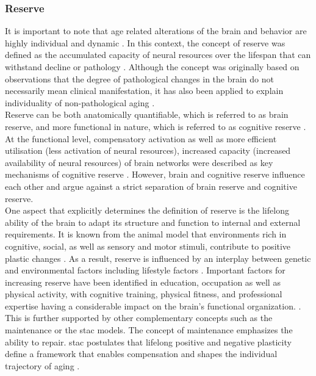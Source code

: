 \subsubsection{Reserve}
\label{theory:aging:reserve}
It is important to note that age related alterations of the brain and behavior are highly individual and dynamic \cite{Smith2020,Koen2019,Douw2014}. In this context, the concept of reserve was defined as the accumulated capacity of neural resources over the lifespan that can withstand decline or pathology \cite{Cabeza2018, Stern2009}. Although the concept was originally based on observations that the degree of pathological changes in the brain do not necessarily mean clinical manifestation, it has also been applied to explain individuality of non-pathological aging \cite{Esiri2001,Cabeza2018,Stern2009}.\\
Reserve can be both anatomically quantifiable, which is referred to as brain reserve, and more functional in nature, which is referred to as cognitive reserve \cite{Stern2009}. At the functional level, compensatory activation as well as more efficient utilisation (less activation of neural resources), increased capacity (increased availability of neural resources) of brain networks were described as key mechanisms of cognitive reserve \cite{Stern2004,Stern2009}. However, brain and cognitive reserve influence each other and \citeauthor{Cabeza2018} \cite{Cabeza2018} argue against a strict separation of brain reserve and cognitive reserve.\\
One aspect that explicitly determines the definition of reserve is the lifelong ability of the brain to adapt its structure and function to internal and external requirements. It is known from the animal model that environments rich in cognitive, social, as well as sensory and motor stimuli, contribute to positive plastic changes \cite{Fabel2009}. As a result, reserve is influenced by an interplay between genetic and environmental factors including lifestyle factors \cite{Cabeza2018}. Important factors for increasing reserve have been identified in education, occupation as well as physical activity, with cognitive training, physical fitness, and professional expertise having a considerable impact on the brain's functional organization. \cite{vieluf2018age,VOSS2016113,Soldan2021}.\\
This is further supported by other complementary concepts such as the maintenance or the \gls{stac} models. The concept of maintenance emphasizes the ability to repair. \Gls{stac} postulates that lifelong positive and negative plasticity define a framework that enables compensation and shapes the individual trajectory of aging \cite{Reuter-Lorenz2014}.\\        

